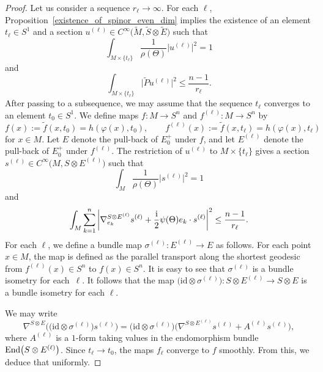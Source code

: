 \documentclass[pdftex]{sigma}
\numberwithin{equation}{section}
\newcommand{\id}{\mathrm{id}}
\begin{document}
\begin{proof}
Let us consider a sequence $r_\ell \to \infty$. For each $\ell$, Proposition~\ref{existence_of_spinor_even_dim} implies the existence of an element $t_\ell \in S^1$ and a section $u^{(\ell)} \in C^\infty\big(\tilde{M},\tilde{S} \otimes \tilde{E}\big)$ such that
\[
 \int_{M \times \{t_\ell\}} \frac{1}{\rho(\Theta)}\big|u^{(\ell)}\big|^2 = 1
\]
and
\[\int_{M \times \{t_\ell\}} \big|\tilde{P} u^{(\ell)}\big|^2 \leq \frac{n-1}{r_\ell}.
\]
After passing to a subsequence, we may assume that the sequence $t_\ell$ converges to an element $t_0 \in S^1$. We define maps $f\colon M \to S^n$ and $f^{(\ell)}\colon M \to S^n$ by
\[
 f(x) := \tilde{f}(x,t_0) = h(\varphi(x),t_0), \qquad f^{(\ell)}(x) := \tilde{f}(x,t_\ell) = h(\varphi(x) ,t_\ell)
\]
for $x \in M$.
Let $E$ denote the pull-back of $E_0^+$ under $f$, and let $E^{(\ell)}$ denote the pull-back of $E_0^+$ under $f^{(\ell)}$.
The restriction of $u^{(\ell)}$ to $M \times \{t_\ell\}$ gives a section $s^{(\ell)} \in C^\infty\big(M,S \otimes E^{(\ell)}\big)$ such that
\[
 \int_M \frac{1}{\rho(\Theta)}\big|s^{(\ell)}\big|^2 = 1
 \]
and
\begin{equation}
 \int_M \sum_{k=1}^n \left| \nabla_{e_k}^{S \otimes E^{(\ell)}} s^{(\ell)} + \frac{\rm i}{2} \psi(\Theta) e_k \cdot s^{(\ell)} \right|^2 \leq \frac{n-1}{r_\ell}.
\label{eq:almostflat}
\end{equation}
For each $\ell$, we define a bundle map $\sigma^{(\ell)}\colon E^{(\ell)} \to E$ as follows.
For each point $x \in M$, the map  is defined as the parallel transport along the shortest geodesic from $f^{(\ell)}(x) \in S^n$ to $f(x) \in S^n$.
It is easy to see that $\sigma^{(\ell)}$ is a bundle isometry for each~$\ell$. It follows that the map $\big(\id \otimes \sigma^{(\ell)}\big)\colon S \otimes E^{(\ell)} \to S \otimes E$ is a bundle isometry for each $\ell$.

We may write
\begin{equation}
\label{eq:A_l_term}
\nabla^{S \otimes E}\big(\big(\id \otimes \sigma^{(\ell)}\big) s^{(\ell)}\big) = \big(\id \otimes \sigma^{(\ell)}\big) \big(\nabla^{S \otimes E^{(\ell)}} s^{(\ell)} + A^{(\ell)} s^{(\ell)}\big),
\end{equation}
where $A^{(\ell)}$ is a $1$-form taking values in the endomorphism bundle $\text{\rm End}\big(S \otimes E^{(\ell)}\big)$. Since $t_\ell \to t_0$, the maps $f_\ell$ converge to $f$ smoothly. From this, we deduce that  uniformly.


\end{proof}
\end{document}
